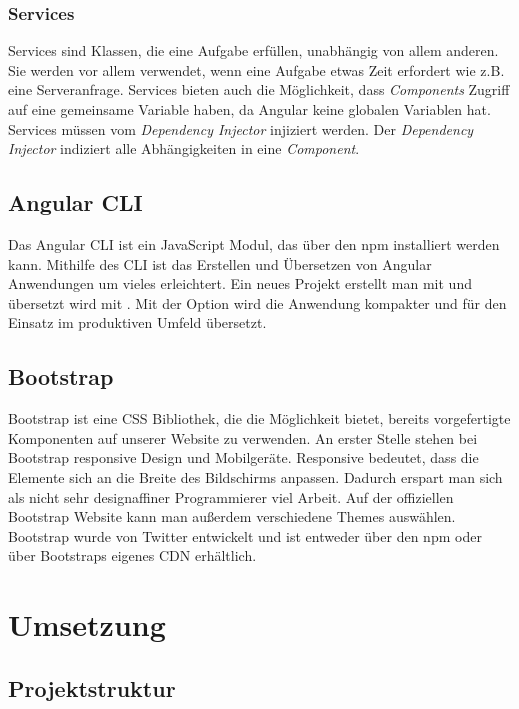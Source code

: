 \subsubsection{Services}
\label{sec:ang-services}
Services sind Klassen, die eine Aufgabe erfüllen, unabhängig von allem anderen. Sie werden vor allem verwendet, wenn eine Aufgabe etwas Zeit erfordert wie z.B. eine Serveranfrage. Services bieten auch die Möglichkeit, dass \textit{Components} Zugriff auf eine gemeinsame Variable haben, da Angular keine globalen Variablen hat. Services müssen vom \textit{Dependency Injector} injiziert werden. Der \textit{Dependency Injector} indiziert alle Abhängigkeiten in eine \textit{Component}.

\subsection{Angular CLI}
\label{sec:vor-angular-cli}
Das Angular \ac{CLI} ist ein JavaScript Modul, das über den \ac{npm} installiert werden kann. Mithilfe des \ac{CLI} ist das Erstellen und Übersetzen von Angular Anwendungen um vieles erleichtert. Ein neues Projekt erstellt man mit  und übersetzt wird mit . Mit der Option  wird die Anwendung kompakter und für den Einsatz im produktiven Umfeld übersetzt.

\subsection{Bootstrap}
\label{sec:vor-bootstrap}
Bootstrap ist eine CSS Bibliothek, die die Möglichkeit bietet, bereits vorgefertigte Komponenten auf unserer Website zu verwenden. An erster Stelle stehen bei Bootstrap responsive Design und Mobilgeräte. Responsive bedeutet, dass die Elemente sich an die Breite des Bildschirms anpassen. Dadurch erspart man sich als nicht sehr designaffiner Programmierer viel Arbeit. Auf der offiziellen Bootstrap Website kann man außerdem verschiedene Themes auswählen. Bootstrap wurde von Twitter entwickelt und ist entweder über den \ac{npm} oder über Bootstraps eigenes \ac{CDN} erhältlich.

\section{Umsetzung}
\label{sec:umsetzung}

\subsection{Projektstruktur}
\label{sec:ums-projektstruktur}

